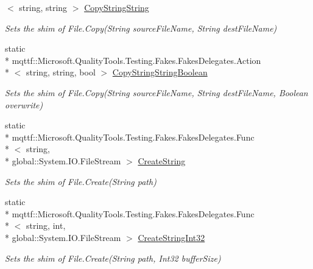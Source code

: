 \begin{DoxyCompactItemize}
$<$ string, string $>$ \hyperlink{class_system_1_1_i_o_1_1_fakes_1_1_shim_file_a37e452847b42be5a401f1a52f05f720f}{Copy\-String\-String}
\begin{DoxyCompactList}\small\item\em Sets the shim of File.\-Copy(\-String source\-File\-Name, String dest\-File\-Name)\end{DoxyCompactList}\item 
static \\*
mqttf\-::\-Microsoft.\-Quality\-Tools.\-Testing.\-Fakes.\-Fakes\-Delegates.\-Action\\*
$<$ string, string, bool $>$ \hyperlink{class_system_1_1_i_o_1_1_fakes_1_1_shim_file_a2860c0f04abb0820438f504a56bd133a}{Copy\-String\-String\-Boolean}
\begin{DoxyCompactList}\small\item\em Sets the shim of File.\-Copy(\-String source\-File\-Name, String dest\-File\-Name, Boolean overwrite)\end{DoxyCompactList}\item 
static \\*
mqttf\-::\-Microsoft.\-Quality\-Tools.\-Testing.\-Fakes.\-Fakes\-Delegates.\-Func\\*
$<$ string, \\*
global\-::\-System.\-I\-O.\-File\-Stream $>$ \hyperlink{class_system_1_1_i_o_1_1_fakes_1_1_shim_file_a69ed1ad3f6ab2d20da5f7eedfc023bab}{Create\-String}
\begin{DoxyCompactList}\small\item\em Sets the shim of File.\-Create(\-String path)\end{DoxyCompactList}\item 
static \\*
mqttf\-::\-Microsoft.\-Quality\-Tools.\-Testing.\-Fakes.\-Fakes\-Delegates.\-Func\\*
$<$ string, int, \\*
global\-::\-System.\-I\-O.\-File\-Stream $>$ \hyperlink{class_system_1_1_i_o_1_1_fakes_1_1_shim_file_a074ac0af2cbce5ef8c2ab0cf44ad8a89}{Create\-String\-Int32}
\begin{DoxyCompactList}\small\item\em Sets the shim of File.\-Create(\-String path, Int32 buffer\-Size)\end{DoxyCompactList}\item 

\end{DoxyCompactItemize}
